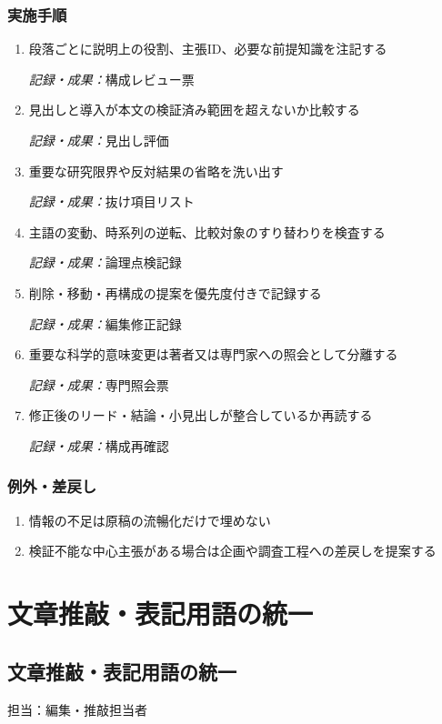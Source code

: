 \documentclass[a4paper,11pt]{article}
\begin{document}
\subsubsection*{実施手順}
\begin{enumerate}[leftmargin=2em,itemsep=0.65em]
\item 段落ごとに説明上の役割、主張ID、必要な前提知識を注記する\par\noindent\textit{記録・成果：}構成レビュー票\nobreak\smallskip
\item 見出しと導入が本文の検証済み範囲を超えないか比較する\par\noindent\textit{記録・成果：}見出し評価\nobreak\smallskip
\item 重要な研究限界や反対結果の省略を洗い出す\par\noindent\textit{記録・成果：}抜け項目リスト\nobreak\smallskip
\item 主語の変動、時系列の逆転、比較対象のすり替わりを検査する\par\noindent\textit{記録・成果：}論理点検記録\nobreak\smallskip
\item 削除・移動・再構成の提案を優先度付きで記録する\par\noindent\textit{記録・成果：}編集修正記録\nobreak\smallskip
\item 重要な科学的意味変更は著者又は専門家への照会として分離する\par\noindent\textit{記録・成果：}専門照会票\nobreak\smallskip
\item 修正後のリード・結論・小見出しが整合しているか再読する\par\noindent\textit{記録・成果：}構成再確認\nobreak\smallskip
\end{enumerate}
\subsubsection*{例外・差戻し}
\begin{enumerate}[leftmargin=2em,itemsep=0.35em]
\item 情報の不足は原稿の流暢化だけで埋めない
\item 検証不能な中心主張がある場合は企画や調査工程への差戻しを提案する
\end{enumerate}
\section{文章推敲・表記用語の統一}
\subsection{文章推敲・表記用語の統一}
\par 担当：編集・推敲担当者\par\medskip
\end{document}
